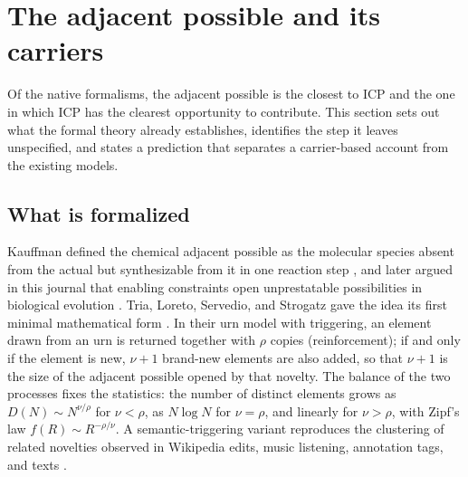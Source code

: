 \section{The adjacent possible and its carriers}
\label{sec:ap}

Of the native formalisms, the adjacent possible is the closest to ICP and the
one in which ICP has the clearest opportunity to contribute. This section sets
out what the formal theory already establishes, identifies the step it leaves
unspecified, and states a prediction that separates a carrier-based account
from the existing models.

\subsection{What is formalized}

Kauffman defined the chemical adjacent possible as the molecular species absent
from the actual but synthesizable from it in one reaction step
\citep[p.~142]{Kauffman2000Investigations}, and later argued in this journal
that enabling constraints open unprestatable possibilities in biological
evolution \citep{Kauffman2014Prolegomenon,PatraKauffman2025NoLaw}. Tria,
Loreto, Servedio, and Strogatz gave the idea its first minimal mathematical
form \citep{TriaEtAl2014Novelties}. In their urn model with triggering, an
element drawn from an urn is returned together with $\rho$ copies
(reinforcement); if and only if the element is new, $\nu+1$ brand-new elements
are also added, so that $\nu+1$ is the size of the adjacent possible opened by
that novelty. The balance of the two processes fixes the statistics: the number
of distinct elements grows as $D(N)\sim N^{\nu/\rho}$ for $\nu<\rho$, as $N\log
N$ for $\nu=\rho$, and linearly for $\nu>\rho$, with Zipf's law $f(R)\sim
R^{-\rho/\nu}$. A semantic-triggering variant reproduces the clustering of
related novelties observed in Wikipedia edits, music listening, annotation tags,
and texts \citep{TriaEtAl2014Novelties}.

